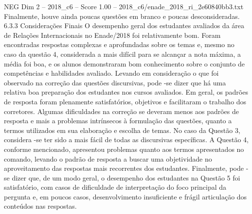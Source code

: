 \begin{textsample}{NEG Dim 2 – 2018\_c6 – Score 1.00 – 2018\_c6/enade\_2018\_ri\_2e60840bb3.txt}
Finalmente, houve ainda poucas questões em branco e poucas desconsideradas. 6.3.3 Considerações Finais O desempenho geral dos estudantes avaliados da área de Relações Internacionais no Enade/2018 foi relativamente bom.
Foram encontradas respostas complexas e aprofundadas sobre os temas e, mesmo no caso da questão 4, considerada a mais difícil para se alcançar a nota máxima, a média foi boa, e os alunos demonstraram bom conhecimento sobre o conjunto de competências e habilidades avaliado.
Levando em consideração o que foi observado na correção das questões discursivas, pode -se dizer que há uma relativa boa preparação dos estudantes nos cursos avaliados.
Em geral, os padrões de resposta foram plenamente satisfatórios, objetivos e facilitaram o trabalho dos corretores.
Algumas dificuldades na correção se deveram menos aos padrões de resposta e mais a problemas intrínsecos à formulação das questões, quanto a termos utilizados em sua elaboração e escolha de temas.
No caso da Questão 3, considera -se ter sido a mais fácil de todas as discursivas específicas.
A Questão 4, conforme mencionado, apresentou problemas quanto aos termos apresentados no comando, levando o padrão de resposta a buscar uma objetividade no aproveitamento das respostas mais recorrentes dos estudantes.
Finalmente, pode -se dizer que, de um modo geral, o desempenho dos estudantes na Questão 5 foi satisfatório, com casos de dificuldade de interpretação do foco principal da pergunta e, em poucos casos, desenvolvimento insuficiente e frágil articulação dos conteúdos nas respostas.

\end{textsample}
